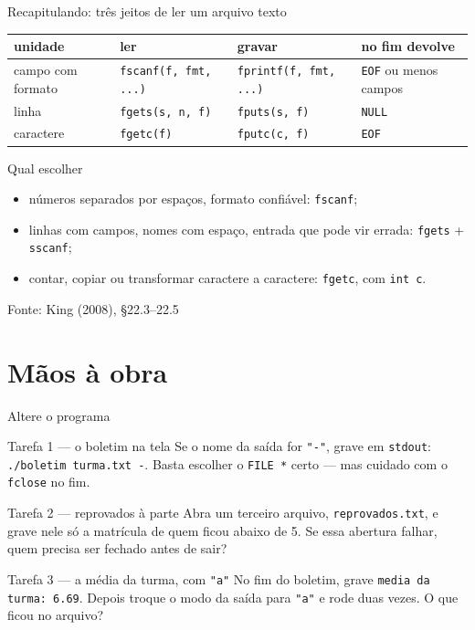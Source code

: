 \documentclass[aspectratio=169]{beamer}
\newcommand{\fonte}[1]{\vfill\hfill{\scriptsize\textcolor{UFSGray}{Fonte: #1}}}
\begin{document}
\begin{frame}{Recapitulando: três jeitos de ler um arquivo texto}
  \begin{center}
  \footnotesize
  \begin{tabular}{@{}llll@{}}
    \toprule
    unidade & ler & gravar & no fim devolve\\
    \midrule
    campo com formato & \texttt{fscanf(f, fmt, ...)} & \texttt{fprintf(f, fmt, ...)} & \texttt{EOF} ou menos campos\\
    linha             & \texttt{fgets(s, n, f)}       & \texttt{fputs(s, f)}         & \texttt{NULL}\\
    caractere         & \texttt{fgetc(f)}             & \texttt{fputc(c, f)}         & \texttt{EOF}\\
    \bottomrule
  \end{tabular}
  \end{center}
  \begin{block}{Qual escolher}
    \begin{itemize}
      \footnotesize
      \item números separados por espaços, formato confiável:
        \texttt{fscanf};
      \item linhas com campos, nomes com espaço, entrada que pode vir
        errada: \texttt{fgets} + \texttt{sscanf};
      \item contar, copiar ou transformar caractere a caractere:
        \texttt{fgetc}, com \texttt{int c}.
    \end{itemize}
  \end{block}
  \fonte{King (2008), §22.3--22.5~\cite{king2008c}}
\end{frame}

\section{Mãos à obra}

\begin{frame}{Altere o programa}
  \begin{block}{Tarefa 1 --- o boletim na tela}
    \small Se o nome da saída for \texttt{"-"}, grave em \texttt{stdout}:
    \texttt{./boletim turma.txt -}. Basta escolher o \texttt{FILE *} certo
    --- mas cuidado com o \texttt{fclose} no fim.
  \end{block}
  \begin{block}{Tarefa 2 --- reprovados à parte}
    \small Abra um terceiro arquivo, \texttt{reprovados.txt}, e grave nele
    só a matrícula de quem ficou abaixo de 5. Se essa abertura falhar,
    quem precisa ser fechado antes de sair?
  \end{block}
  \begin{block}{Tarefa 3 --- a média da turma, com \texttt{"a"}}
    \small No fim do boletim, grave \texttt{media da turma: 6.69}. Depois
    troque o modo da saída para \texttt{"a"} e rode duas vezes. O que ficou
    no arquivo?
  \end{block}
\end{frame}
\end{document}
